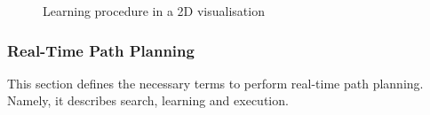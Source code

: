 \documentclass[thesis]{mas_proposal}
\begin{document}
\begin{figure}[h]
	\caption{Learning procedure in a 2D visualisation}
	\label{fig:path_planning_on_graph}
\end{figure}   

\subsubsection{Real-Time Path Planning}

This section defines the necessary terms to perform real-time path planning. Namely, it describes search, learning and execution.
\end{document}
